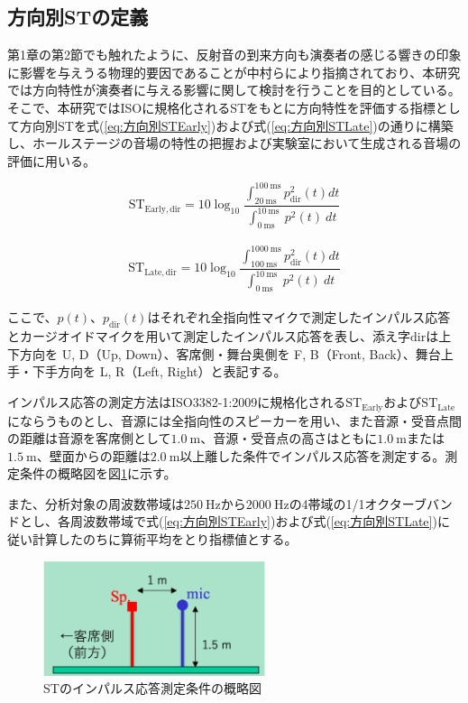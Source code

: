 \documentclass[11pt,a4j]{jreport}
\begin{document}
\subsection{方向別STの定義}
第1章の第2節でも触れたように、反射音の到来方向も演奏者の感じる響きの印象に影響を与えうる物理的要因であることが中村ら\cite{中村1993}により指摘されており、本研究では方向特性が演奏者に与える影響に関して検討を行うことを目的としている。そこで、本研究ではISOに規格化されるSTをもとに方向特性を評価する指標として方向別STを式(\ref{eq:方向別STEarly})および式(\ref{eq:方向別STLate})の通りに構築し、ホールステージの音場の特性の把握および実験室において生成される音場の評価に用いる。

\begin{equation}
  \label{eq:方向別STEarly}
  \mathrm{ST_{Early,dir}}= 10 \log_{10}
  \frac{\int_{20 \: \mathrm{ms}}^{100 \: \mathrm{ms}} p_{\mathrm{dir}}^2(t) dt}
  {\int_{0 \: \mathrm{ms}}^{10 \: \mathrm{ms}} \: p^2(t) \: dt}
\end{equation}\\
\begin{equation}
  \label{eq:方向別STLate}
  \mathrm{ST_{Late,dir}}= 10 \log_{10}
  \frac{\int_{100 \: \mathrm{ms}}^{1000 \: \mathrm{ms}} p_{\mathrm{dir}}^2(t) dt}
  {\int_{0 \: \mathrm{ms}}^{10 \: \mathrm{ms}} \: p^2(t) \: dt}
\end{equation}\\

ここで、$p(t)$、$p_{\mathrm{dir}}(t)$はそれぞれ全指向性マイクで測定したインパルス応答とカージオイドマイクを用いて測定したインパルス応答を表し、添え字$\mathrm{dir}$は上下方向を U, D（Up, Down）、客席側・舞台奥側を F, B（Front, Back）、舞台上手・下手方向を L, R（Left, Right）と表記する。

インパルス応答の測定方法はISO3382-1:2009に規格化される$\mathrm{ST_{Early}}$および$\mathrm{ST_{Late}}$にならうものとし、音源には全指向性のスピーカーを用い、また音源・受音点間の距離は音源を客席側として$\SI{1.0}{\m}$、音源・受音点の高さはともに$\SI{1.0}{\m}$または$\SI{1.5}{\m}$、壁面からの距離は$\SI{2.0}{\m}$以上離した条件でインパルス応答を測定する。測定条件の概略図を図\ref{fig:STのIR測定条件}に示す。

また、分析対象の周波数帯域は$\SI{250}{\Hz}$から$\SI{2000}{\Hz}$の4帯域の1/1オクターブバンドとし、各周波数帯域で式(\ref{eq:方向別STEarly})および式(\ref{eq:方向別STLate})に従い計算したのちに算術平均をとり指標値とする。

\begin{figure}[H]
  \centering
  \includegraphics[width=6.5cm,clip]{images/howToMeasureST.png}
  \caption{STのインパルス応答測定条件の概略図}
  \label{fig:STのIR測定条件}
\end{figure}
\end{document}
